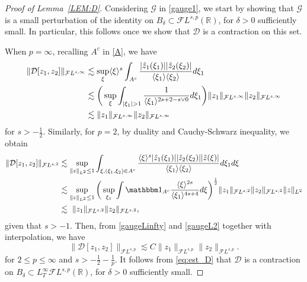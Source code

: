\documentclass[%
11pt,  reqno]{amsart}
\newcommand{\jap}[1]{\langle #1 \rangle}
\newcommand{\5}{\textup{V}}
\newcommand{\FL}{\mathcal{F} L}
\newcommand{\ind}{\mathbbm 1}
\newcommand{\les}{\lesssim}
\newcommand{\dl}{\delta}
\theoremstyle{remark}
\newcommand{\R}{\mathbb{R}}
\newcommand{\jb}[1]
{\langle #1 \rangle}
\newcommand{\Gc}{\mathcal{G}}
\numberwithin{equation}{section}
\numberwithin{theorem}{section}
\newcommand{\D}{\mathrm{D}}
\newcommand{\DD}{\mathcal{D}}
\begin{document}
\begin{proof}[Proof of Lemma~\ref{LEM:D}]

Considering $\Gc$ in \eqref{gauge1}, we start by showing that $\Gc$ is a small perturbation of the identity on $B_\dl \subset  \FL^{s, p}(\R)$, for $\dl>0$ sufficiently small. In particular, this follows once we show that $\DD$ is a contraction on this set. 

When $p=\infty$, recalling $A^c$ in \eqref{A}, we have
\begin{align}
\|\DD[z_{1},z_{2}]\|_{\mathcal{F}L^{s,\infty}}   
&
\les
\sup_\xi \jb{\xi}^s \int_{A^c} 
\frac{|\hat{z}_{1}(\xi_{1})||\hat{z}_{2}(\xi_{2})|}{\jap{\xi_{1}}\jap{\xi_{2}}} d\xi_{1} 
\notag
\\
&\les
\bigg( \sup_{\xi} \int_{|\xi_{1}|>1} \frac{1}{\jap{\xi_{1}}^{2s+2 - s\lor 0 }} d\xi_{1} 
\bigg) 
\|z_{1}\|_{\mathcal{F}L^{s,\infty}}\|z_{2}\|_{ \mathcal{F}L^{s,\infty}}
\notag
\\
& \les
\|z_{1}\|_{ \mathcal{F}L^{s,\infty}}
\|z_{2}\|_{ \mathcal{F}L^{s,\infty}}
\label{gaugeLinfty}
\end{align}
for $s>-\frac12$.
Similarly, for $p=2$, by duality and Cauchy-Schwarz inequality, we obtain
\begin{align}
\|\DD[z_{1},z_{2}]\|_{\mathcal{F}L^{s,2}}   
&
\les 
\sup_{\|z\|_{L^2} \le 1 }
	 \int_{\xi, (\xi_1,\xi_2)\in A^c} \frac{\jap{\xi}^s|\hat{z}_{1}(\xi_{1})||\hat{z}_{2}(\xi_{2})||\hat{z}(\xi)|}{\jap{\xi_{1}}\jap{\xi_{2}}} d\xi_{1}d\xi 
     \notag
    \\
    & \les \sup_{\|z\|_{L^2 } \le 1}  \bigg( \sup_{\xi_{1}}  \int \ind_{A^c} \frac{\jap{\xi}^{2s}}{\jap{\xi_{1}}^{4s+4}}d\xi \bigg)^{\frac{1}{2}}
\|z_{1}\|_{\mathcal{F}L^{s,2}}\|z_{2}\|_{\mathcal{F}L^{s,2}}\|z\|_{L^2}
\notag
\\
&
\lesssim\  \|z_{1}\|_{\mathcal{F}L^{s,2}}\|z_{2}\|_{ \mathcal{F}L^{s,2}}, 
\label{gaugeL2}
\end{align}
given that $s>-1$. 
Then, from \eqref{gaugeLinfty} and \eqref{gaugeL2} together with interpolation, we have
\begin{equation}\label{eq:est_D}
		\|\DD[z_{1},z_{2}]\|_{ \mathcal{F}L^{s,p}}
        \les
C\|z_{1}\|_{ \mathcal{F}L^{s,p}}\|z_{2}\|_{ \mathcal{F}L^{s,p}}. 
\end{equation}
for $2 \le p \le \infty$ and $s> -\frac12 - \frac1p$.
It follows from \eqref{eq:est_D} that $\DD$ is a contraction on $B_\dl \subset L^\infty_T \FL^{s,p}(\R)$, for $\dl>0$ sufficiently small.





\end{proof}
\end{document}
